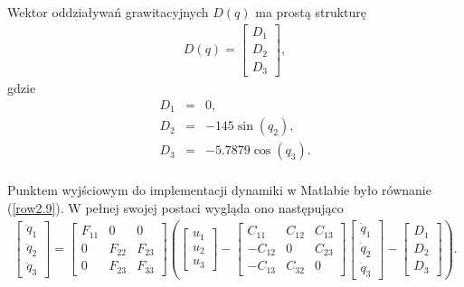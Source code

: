 \documentclass[eng,printmode]{mgr}
\begin{document}
Wektor oddziaływań grawitacyjnych $D(q)$ ma prostą strukturę
\begin{eqnarray}
D(q)=  \left[
        \begin{array}{c}
         D_1\\ 
        D_2\\
         D_3
         \end{array}
      \right],
\end{eqnarray}
 gdzie
 \begin{eqnarray}
D_1 &=& 0, \nonumber\\
D_2 &=& -145\sin(q_2), \nonumber\\
D_3 &=& -5.7879\cos(q_3) . \nonumber\\
\end{eqnarray}


Punktem wyjściowym do implementacji dynamiki w Matlabie było równanie (\ref{row2.9}).
W pełnej swojej postaci wygląda ono następująco
  \begin{eqnarray}
 \left[
        \begin{array}{c}
         \ddot{q}_1\\ 
        \ddot{q}_2\\
         \ddot{q}_3
         \end{array}
      \right]=\left[
        \begin{array}{ccc}
         F_{11} & 0 & 0\\ 
         0 & F_{22}  & F_{23}\\
         0 & F_{23}  & F_{33}
         \end{array}
      \right]\left(\left[
      \begin{array}{c}
         u_1\\ 
        u_2\\
         u_3
         \end{array}
      \right]-\left[
      \begin{array}{ccc}
         C_{11} & C_{12} & C_{13}\\ 
         -C_{12} & 0 & C_{23}\\
         -C_{13} & C_{32} & 0
         \end{array}
      \right]\left[
        \begin{array}{c}
         \dot{q}_1\\ 
        \dot{q}_2\\
         \dot{q}_3
         \end{array}
      \right]-\left[
        \begin{array}{c}
         D_1\\ 
        D_2\\
         D_3
         \end{array}
      \right]
      \right).   
 \end{eqnarray}
\end{document}
